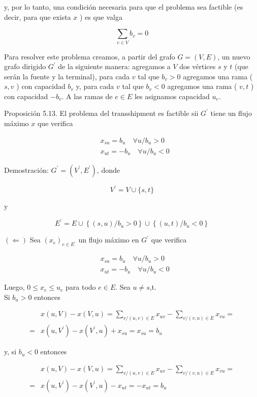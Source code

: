 \documentclass[10pt]{article}
\begin{document}
y, por lo tanto, una condición necesaria para que el problema sea factible (es decir, para que exista $x$ ) es que valga

$$
\sum_{v \in V} b_{v}=0
$$

Para resolver este problema creamos, a partir del grafo $G=(V, E)$, un nuevo grafo dirigido $G^{\prime}$ de la siguiente manera: agregamos a $V$ dos vértices $s$ y $t$ (que serán la fuente y la terminal), para cada $v$ tal que $b_{v}>0$ agregamos una rama ( $s, v$ ) con capacidad $b_{v}$ y, para cada $v$ tal que $b_{v}<0$ agregamos una rama ( $v, t$ ) con capacidad $-b_{v}$. A las ramas de $e \in E$ les asignamos capacidad $u_{e}$.

Proposición 5.13. El problema del transshipment es factible sii $G^{\prime}$ tiene un flujo máximo $x$ que verifica

$$
\begin{aligned}
& x_{s u}=b_{u} \quad \forall u / b_{u}>0 \\
& x_{u t}=-b_{u} \quad \forall u / b_{u}<0
\end{aligned}
$$

Demostración: $G^{\prime}=\left(V^{\prime}, E^{\prime}\right)$, donde

$$
V^{\prime}=V \cup\{s, t\}
$$

y

$$
E^{\prime}=E \cup\left\{(s, u) / b_{u}>0\right\} \cup\left\{(u, t) / b_{u}<0\right\}
$$

$(\Longleftarrow)$ Sea $\left(x_{e}\right)_{e \in E^{\prime}}$ un flujo máximo en $G^{\prime}$ que verifica

$$
\begin{aligned}
& x_{s u}=b_{u} \quad \forall u / b_{u}>0 \\
& x_{u t}=-b_{u} \quad \forall u / b_{u}<0
\end{aligned}
$$

Luego, $0 \leq x_{e} \leq u_{e}$ para todo $e \in E$. Sea $u \neq s$,t.\\
Si $b_{u}>0$ entonces

$$
\begin{aligned}
& x(u, V)-x(V, u)=\sum_{v /(u, v) \in E} x_{u v}-\sum_{v /(v, u) \in E} x_{v u}= \\
= & x\left(u, V^{\prime}\right)-x\left(V^{\prime}, u\right)+x_{s u}=x_{s u}=b_{u}
\end{aligned}
$$

y, si $b_{u}<0$ entonces

$$
\begin{aligned}
& x(u, V)-x(V, u)=\sum_{v /(u, v) \in E} x_{u v}-\sum_{v /(v, u) \in E} x_{v u}= \\
= & x\left(u, V^{\prime}\right)-x\left(V^{\prime}, u\right)-x_{u t}=-x_{u t}=b_{u}
\end{aligned}
$$
\end{document}
